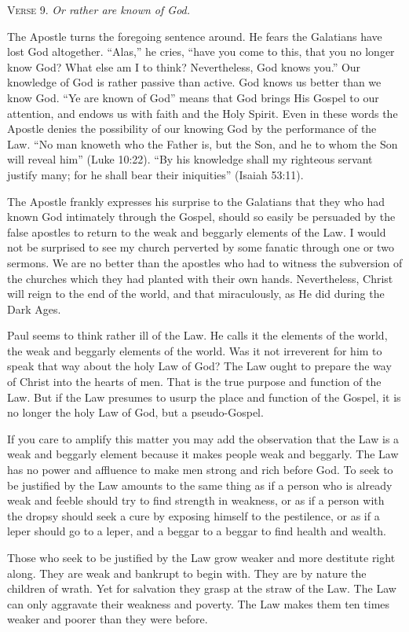 \textsc{Verse} 9. \emph{Or rather are known of God.}

The Apostle turns the foregoing sentence around. He fears the Galatians have lost God altogether. “Alas,” he cries, “have you come to this, that you no longer know God? What else am I to think? Nevertheless, God knows you.” Our knowledge of God is rather passive than active. God knows us better than we know God. “Ye are known of God” means that God brings His Gospel to our attention, and endows us with faith and the Holy Spirit. Even in these words the Apostle denies the possibility of our knowing God by the performance of the Law. “No man knoweth who the Father is, but the Son, and he to whom the Son will reveal him” (Luke 10:22). “By his knowledge shall my righteous servant justify many; for he shall bear their iniquities” (Isaiah 53:11).

The Apostle frankly expresses his surprise to the Galatians that they who had known God intimately through the Gospel, should so easily be persuaded by the false apostles to return to the weak and beggarly elements of the Law. I would not be surprised to see my church perverted by some fanatic through one or two sermons. We are no better than the apostles who had to witness the subversion of the churches which they had planted with their own hands. Nevertheless, Christ will reign to the end of the world, and that miraculously, as He did during the Dark Ages.

Paul seems to think rather ill of the Law. He calls it the elements of the world, the weak and beggarly elements of the world. Was it not irreverent for him to speak that way about the holy Law of God? The Law ought to prepare the way of Christ into the hearts of men. That is the true purpose and function of the Law. But if the Law presumes to usurp the place and function of the Gospel, it is no longer the holy Law of God, but a pseudo-Gospel.

If you care to amplify this matter you may add the observation that the Law is a weak and beggarly element because it makes people weak and beggarly. The Law has no power and affluence to make men strong and rich before God. To seek to be justified by the Law amounts to the same thing as if a person who is already weak and feeble should try to find strength in weakness, or as if a person with the dropsy should seek a cure by exposing himself to the pestilence, or as if a leper should go to a leper, and a beggar to a beggar to find health and wealth.

Those who seek to be justified by the Law grow weaker and more destitute right along. They are weak and bankrupt to begin with. They are by nature the children of wrath. Yet for salvation they grasp at the straw of the Law. The Law can only aggravate their weakness and poverty. The Law makes them ten times weaker and poorer than they were before.

